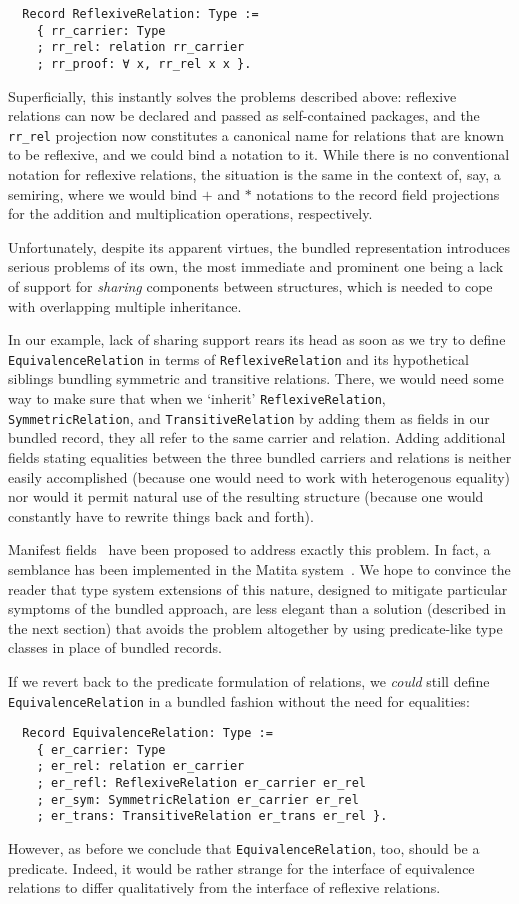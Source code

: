 \documentclass[a4paper,10pt,runningheads]{llncs}
\begin{document}
\begin{lstlisting}
  Record ReflexiveRelation: Type :=
    { rr_carrier: Type
    ; rr_rel: relation rr_carrier
    ; rr_proof: ∀ x, rr_rel x x }.
\end{lstlisting}
Superficially, this instantly solves the problems described above: reflexive relations can now be declared and passed as self-contained packages, and the \lstinline|rr_rel| projection now constitutes a canonical name for relations that are known to be reflexive, and we could bind a notation to it. While there is no conventional notation for reflexive relations, the situation is the same in the context of, say, a semiring, where we would bind $+$ and $*$ notations to the record field projections for the addition and multiplication operations, respectively.

Unfortunately, despite its apparent virtues, the bundled representation introduces serious problems of its own, the most immediate and prominent one being a lack of support for \emph{sharing} components between structures, which is needed to cope with overlapping multiple inheritance.

In our example, lack of sharing support rears its head as soon as we try to define \lstinline|EquivalenceRelation| in terms of \lstinline|ReflexiveRelation| and its hypothetical siblings bundling symmetric and transitive relations. There, we would need some way to make sure that when we `inherit' \lstinline|ReflexiveRelation|, \lstinline|SymmetricRelation|, and \lstinline|TransitiveRelation| by adding them as fields in our bundled record, they all refer to the same carrier and relation. Adding additional fields stating equalities between the three bundled carriers and relations is neither easily accomplished (because one would need to work with heterogenous equality) nor would it permit natural use of the resulting structure (because one would constantly have to rewrite things back and forth).

Manifest fields~\cite{Pollack:2002} have been proposed to address exactly this problem. In fact, a semblance has been implemented in the Matita system~\cite{sacerdoti2008working}. We hope to convince the reader that type system extensions of this nature, designed to mitigate particular symptoms of the bundled approach, are less elegant than a solution (described in the next section) that avoids the problem altogether by using predicate-like type classes in place of bundled records.

If we revert back to the predicate formulation of relations, we \emph{could} still define \lstinline|EquivalenceRelation| in a bundled fashion without the need for equalities:
\begin{lstlisting}
  Record EquivalenceRelation: Type :=
    { er_carrier: Type
    ; er_rel: relation er_carrier
    ; er_refl: ReflexiveRelation er_carrier er_rel
    ; er_sym: SymmetricRelation er_carrier er_rel
    ; er_trans: TransitiveRelation er_trans er_rel }.
\end{lstlisting}
However, as before we conclude that \mbox{\lstinline|EquivalenceRelation|,} too, should be a predicate. Indeed, it would be rather strange for the interface of equivalence relations to differ qualitatively from the interface of reflexive relations.
\end{document}
